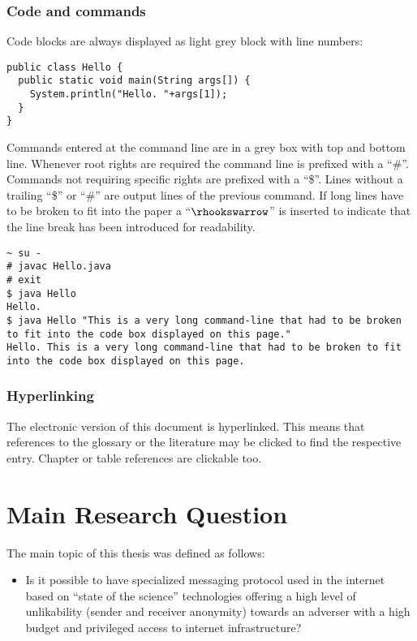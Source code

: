 \subsection{Code and commands}
Code blocks are always displayed as light grey block with line numbers:

\begin{lstlisting}
public class Hello {
  public static void main(String args[]) {
    System.println("Hello. "+args[1]);
  }
}
\end{lstlisting}

Commands entered at the command line are in a grey box with top and bottom line. Whenever root rights are required the command line is prefixed with a ``\#''. Commands not requiring specific rights are prefixed with a ``\$''. Lines without a trailing ``\$'' or ``\#'' are output lines of the previous command. If long lines have to be broken to fit into the paper a ``$\rhookswarrow$'' is inserted to indicate that the line break has been introduced for readability.

\begin{lstlisting}[style=BashInputStyle]
~ su -
# javac Hello.java 
# exit
$ java Hello
Hello.
$ java Hello "This is a very long command-line that had to be broken to fit into the code box displayed on this page."
Hello. This is a very long command-line that had to be broken to fit into the code box displayed on this page.
\end{lstlisting}

\subsection{Hyperlinking}
The electronic version of this  document is hyperlinked. This means that references to the glossary or the literature may be clicked to find the respective entry. Chapter or table references are clickable too. 

\chapter{Main Research Question}
The main topic of this thesis was defined as follows:
\begin{itemize}
	\item Is it possible to have specialized messaging protocol used in the internet based on ``state of the science'' technologies offering a high level of unlikability (sender and receiver anonymity) towards an adverser with a high budget and privileged access to internet infrastructure?
\end{itemize}

